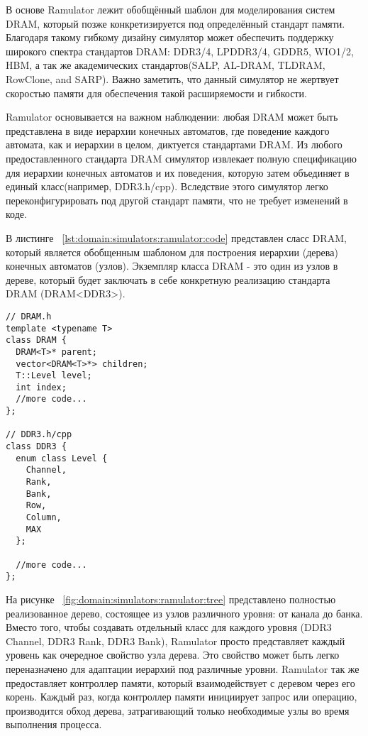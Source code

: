 В основе Ramulator лежит обобщённый шаблон для моделирования систем DRAM, который позже конкретизируется под определённый стандарт памяти. Благодаря такому гибкому дизайну симулятор может обеспечить поддержку широкого спектра стандартов DRAM: DDR3/4, LPDDR3/4, GDDR5, WIO1/2, HBM, а так же академических стандартов(SALP, AL-DRAM, TLDRAM, RowClone, and SARP).  Важно заметить, что данный симулятор не жертвует скоростью памяти для обеспечения такой расширяемости и гибкости. 

Ramulator основывается на важном наблюдении: любая DRAM может быть представлена в виде иерархии конечных автоматов, где поведение каждого автомата, как и иерархии в целом, диктуется стандартами DRAM.
Из любого предоставленного стандарта DRAM симулятор извлекает полную спецификацию для иерархии конечных автоматов и их поведения, которую затем объединяет в единый класс(например, DDR3.h/cpp). Вследствие этого симулятор легко переконфигурировать под другой стандарт памяти, что не требует изменений в коде.

В листинге ~\ref{lst:domain:simulators:ramulator:code} представлен сласс DRAM, который является обобщенным шаблоном для построения иерархии (дерева) конечных автоматов (узлов). Экземпляр класса DRAM  - это один из узлов в дереве, который будет заключать в себе конкретную реализацию стандарта DRAM (DRAM<DDR3>).

\begin{lstlisting}[style=cplusplusstyle, caption={Метод записи конкретных бит в слове}, label=lst:domain:simulators:ramulator:code]
// DRAM.h
template <typename T>
class DRAM {
  DRAM<T>* parent;
  vector<DRAM<T>*> children;
  T::Level level;
  int index;
  //more code...
};

// DDR3.h/cpp
class DDR3 {
  enum class Level {
    Channel,
    Rank,
    Bank,
    Row,
    Column,
    MAX
  };

  //more code...
};
\end{lstlisting}

На рисунке ~\ref{fig:domain:simulators:ramulator:tree} представлено полностью реализованное дерево, состоящее из узлов различного уровня: от канала до банка. Вместо того, чтобы создавать отдельный класс для каждого уровня (DDR3 Channel, DDR3 Rank, DDR3 Bank), Ramulator просто представляет каждый уровень как очередное свойство узла дерева. Это свойство может быть легко переназначено для адаптации иерархий под различные уровни. Ramulator так же предоставляет контроллер памяти, который взаимодействует с деревом через его корень. Каждый раз, когда контроллер памяти инициирует запрос или операцию, производится обход дерева, затрагивающий только необходимые узлы во время выполнения процесса.

